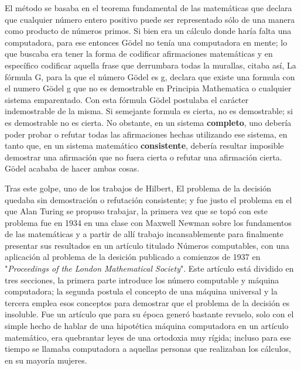 \documentclass{article}
\begin{document}
\begin{multicols}{2}
        \vspace{\baselineskip}
        
        El método se basaba en el teorema fundamental de las matemáticas que declara que cualquier número entero positivo puede ser representado sólo de una manera como producto de números primos.  Si bien era un cálculo donde haría falta una computadora, para ese entonces Gödel no tenía una computadora en mente; lo que buscaba era tener la forma de codificar afirmaciones matemáticas y en específico codificar aquella frase que derrumbara todas la murallas, citaba así, {La fórmula G, para la que el número Gödel es g, declara que existe una formula con el numero Gödel g que no es demostrable en Principia Mathematica o cualquier sistema emparentado}.  Con esta fórmula Gödel postulaba el carácter indemostrable de la misma. Si semejante formula es cierta, no es demostrable; si es demostrable no es cierta. No obstante, en un sistema \textbf{completo}, uno debería poder probar o refutar todas las afirmaciones hechas utilizando ese sistema, en tanto que, en un sistema matemático \textbf{consistente}, debería resultar imposible demostrar una afirmación que no fuera cierta o refutar una afirmación cierta. Gödel acababa de hacer ambas cosas.\cite{turing}
        
        \vspace{\baselineskip}
        
        Tras este golpe, uno de los trabajos de Hilbert, {El problema de la decisión} quedaba sin demostración o refutación consistente; y fue justo el problema en el que Alan Turing se propuso trabajar, la primera vez que se topó con este problema fue en 1934 en una clase con Maxwell Newman sobre los fundamentos de las matemáticas y a partir de allí trabajo incansablemente para finalmente presentar sus resultados en un artículo titulado {Números computables, con una aplicación al problema de la desición} publicado a comienzos de 1937 en "\textit{Proceedings of the London Mathematical Society}". Este artículo está dividido en tres secciones, la primera parte introduce los {número computable} y {máquina computadora}; la segunda postula el concepto de una {máquina universal} y la tercera emplea esos conceptos para demostrar que el problema de la decisión es insoluble.  Fue un artículo que para su época generó bastante revuelo, solo con el simple hecho de hablar de una hipotética {máquina} computadora en un artículo matemático, era quebrantar leyes de una ortodoxia muy rígida; incluso para ese tiempo se llamaba {computadora} a aquellas personas que realizaban los cálculos, en su mayoría mujeres.\cite{turing}
        

\end{multicols}
\end{document}
